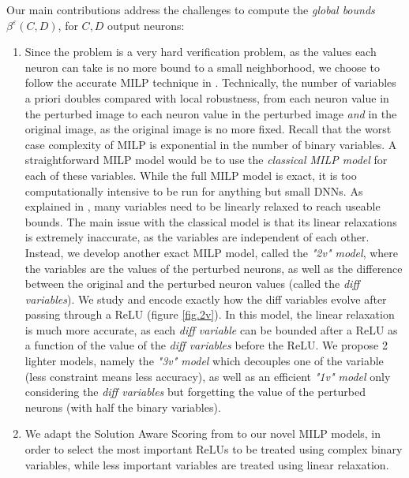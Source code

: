 Our main contributions address the challenges to compute the {\em global bounds} $\beta^\varepsilon(C,D)$, for $C,D$ output neurons:
\begin{enumerate}
	
	\item Since the problem is a very hard verification problem, as the values each neuron can take is no more bound to a small neighborhood, we choose to follow the accurate MILP technique in \cite{ATVA25}. Technically, the number of variables a priori doubles compared with local robustness, from each neuron value in the perturbed image to each neuron value in the perturbed image {\em and} in the original image, as the original image is no more fixed. 
	Recall that the worst case complexity of MILP is exponential in the number of binary variables. A straightforward MILP model would be to use the {\em classical MILP model} \cite{MILP} for each of these variables. While the full MILP model is exact, it is too computationally intensive to be run for anything but small DNNs. As explained in \cite{ATVA25}, many variables need to be linearly relaxed 
	to reach useable bounds. The main issue with the classical model is that its linear relaxations is extremely inaccurate, as the variables are independent of each other. Instead, we develop another exact MILP model,
	called the {\em "2v" model}, where the variables are the values of the perturbed neurons, as well as the difference between the original and the perturbed neuron values (called the {\em diff variables}). We study and encode exactly how the diff variables evolve after passing through a ReLU (figure \ref{fig.2v}). In this model, the linear relaxation is much more accurate, as each 
	{\em diff variable} can be bounded 	after a ReLU as a function of the value of the {\em diff variables} before the ReLU. We propose 2 lighter models, namely the {\em "3v" model} which decouples one of the variable (less constraint means less accuracy), as well as an efficient {\em "1v" model} only considering the {\em diff variables} but forgetting the value of the perturbed neurons (with half the binary variables).
	
	\item We adapt the Solution Aware Scoring from \cite{ATVA25} to our novel MILP models, in order to select the most important ReLUs to be treated using complex binary variables, while less important variables are treated using linear relaxation.


\end{enumerate}
